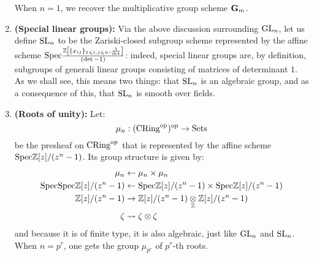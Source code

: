 \begin{example}
\begin{enumerate}
                        When $n = 1$, we recover the multiplicative group scheme $\mathbf{G}_m$.
                        \item \textbf{(Special linear groups):} Via the above discussion surrounding $\operatorname{GL}_n$, let us define $\operatorname{SL}_n$ to be the Zariski-closed subgroup scheme represented by the affine scheme $\mathrm{Spec} \frac{\mathbb{Z}\left[\{x_{ij}\}_{1 \leqslant i,j \leqslant n}, \frac{1}{\det}\right]}{(\det - 1)}$: indeed, special linear groups are, by definition, subgroups of generali linear groups consisting of matrices of determinant $1$. As we shall see, this means two things: that $\operatorname{SL}_n$ is an algebraic group, and as a consequence of this, that $\operatorname{SL}_n$ is smooth over fields. 
                        \item \textbf{(Roots of unity):} Let:
                            $$\mu_n: (\mathrm{CRing}^{\mathrm{op}})^{\mathrm{op}} \to \mathrm{Sets}$$
                        be the presheaf on $\mathrm{CRing}^{\mathrm{op}}$ that is represented by the affine scheme $\mathrm{Spec} \mathbb{Z}[z]/(z^n - 1)$. Its group structure is given by:
                            $$
                                \begin{aligned}
                                    \mu_n & \leftarrow \mu_n \x \mu_n
                                    \\
                                    \Spec \Spec \Z[z]/(z^n - 1) & \leftarrow \Spec \Z[z]/(z^n - 1) \x \Spec \Z[z]/(z^n - 1)
                                    \\
                                    \Z[z]/(z^n - 1) & \to \Z[z]/(z^n - 1) \tensor_{\Z} \Z[z]/(z^n - 1)
                                    \\
                                    \zeta & \mapsto \zeta \tensor \zeta
                                \end{aligned}
                            $$
                        and because it is of finite type, it is also algebraic, just like $\operatorname{GL}_n$ and $\operatorname{SL}_n$. When $n = p^r$, one gets the group $\mu_{p^r}$ of $p^r$-th roots. 
                    \end{enumerate}
                \end{example}
                
